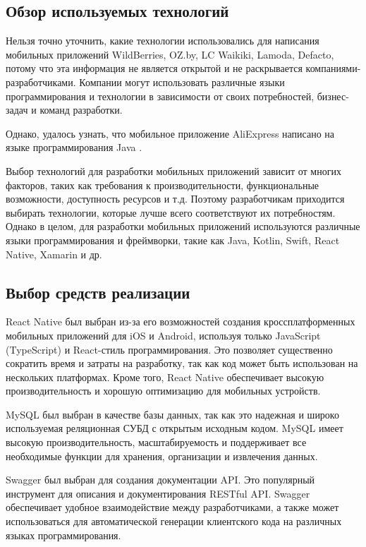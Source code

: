 \subsection{Обзор используемых технологий}

Нельзя точно уточнить, какие технологии использовались для написания мобильных приложений
WildBerries, OZ.by, LC Waikiki, Lamoda, Defacto,
потому что эта информация не является открытой и не раскрывается компаниями-разработчиками.
Компании могут использовать различные языки программирования и технологии в зависимости от своих потребностей,
бизнес-задач и команд разработки.

Однако, удалось узнать, что мобильное приложение AliExpress
написано на языке программирования Java \cite{AliExpressLang} \cite{AliExpressLangForum}.

Выбор технологий для разработки мобильных приложений зависит от многих факторов,
таких как требования к производительности, функциональные возможности, доступность ресурсов и т.д.
Поэтому разработчикам приходится выбирать технологии, которые лучше всего соответствуют их потребностям.
Однако в целом, для разработки мобильных приложений используются различные языки программирования и фреймворки,
такие как Java, Kotlin, Swift, React Native, Xamarin и др.

\subsection{Выбор средств реализации}

React Native \cite{ReactNativeCliGuide} был выбран из-за его возможностей создания кроссплатформенных мобильных приложений для iOS и Android,
используя только JavaScript (TypeScript) и React-стиль программирования.
Это позволяет существенно сократить время и затраты на разработку, так как код может быть использован на нескольких платформах.
Кроме того, React Native обеспечивает высокую производительность и хорошую оптимизацию для мобильных устройств.

MySQL \cite{MySqlInNestJs} был выбран в качестве базы данных, так как это надежная и широко используемая реляционная СУБД с открытым исходным кодом.
MySQL имеет высокую производительность, масштабируемость и поддерживает все необходимые функции для хранения, организации и извлечения данных.

Swagger \cite{SwaggerInNestJs} был выбран для создания документации API.
Это популярный инструмент для описания и документирования RESTful API.
Swagger обеспечивает удобное взаимодействие между разработчиками,
а также может использоваться для автоматической генерации клиентского кода на различных языках программирования.

